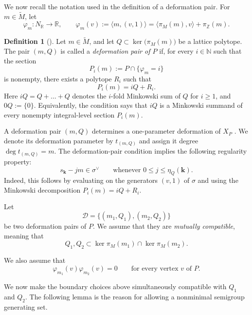 \documentclass[11pt]{amsart}
\numberwithin{equation}{section}
\theoremstyle{plain}
\theoremstyle{definition}
\newtheorem{definition}[theorem]{Definition}
\newcommand{\0}{$0$-mutable}
\newcommand{\NN}{\ensuremath{\mathbb{N}}}
\newcommand{\RR}{\ensuremath{\mathbb{R}}}
\newcommand{\ZZ}{\ensuremath{\mathbb{Z}}}
\renewcommand{\1}{$1$-rigid}
\renewcommand{\0}{$0$-mutable}
\begin{document}
{We now recall the notation used in the definition of a deformation
pair. For \(m\in\widetilde M\), let
\[
\varphi_m\colon N_{\RR}\longrightarrow\RR,
\qquad
\varphi_m(v)
:=
\langle m,(v,1)\rangle
=
\langle\pi_M(m),v\rangle+\pi_{\ZZ}(m).
\]}

{
\begin{definition}[\cite{Fil26}]
\label{def deformation pair}
Let \(m\in\widetilde M\), and let
\(Q\subset\ker\bigl(\pi_M(m)\bigr)\) be a lattice polytope. The pair
\((m,Q)\) is called a \emph{deformation pair of \(P\)} if, for every
\(i\in\NN\) such that the section
\[
P_i(m):=P\cap\{\varphi_m=i\}
\]
is nonempty, there exists a polytope \(R_i\) such that
\[
P_i(m)=iQ+R_i.
\]
Here \(iQ=Q+\ldots+Q\) denotes the \(i\)-fold Minkowski sum of \(Q\) for \(i\geq1\),
and \(0Q:=\{0\}\). Equivalently, the condition says that \(iQ\) is a
Minkowski summand of every nonempty integral-level section \(P_i(m)\).
\end{definition}
}

{A deformation pair \((m,Q)\) determines a one-parameter deformation of
\(X_P\) \cite[Corollary 3.9]{Fil26}.} We denote its deformation parameter
by \(t_{(m,Q)}\) and assign it degree
$
\deg t_{(m,Q)}=m.
$
{The deformation-pair condition implies the following regularity property:
\begin{equation}
\label{eq one parameter regularity}
s_{\mathbf k}-jm\in\sigma^\vee
\qquad
\text{whenever }0\le j\le\eta_Q(\mathbf k).
\end{equation}
Indeed, this follows by evaluating on the generators $(v,1)$ of
$\sigma$ and using the Minkowski decomposition
$P_i(m)=iQ+R_i$.}

Let
\[
\mathcal D
=
\bigl\{(m_1,Q_1),(m_2,Q_2)\bigr\}
\]
be two deformation pairs of \(P\). We assume that they are
\emph{mutually compatible}, meaning that
\begin{equation}
\label{eq mutually orthogonal summands}
Q_1,Q_2
\subset
\ker\pi_M(m_1)\cap\ker\pi_M(m_2).
\end{equation}

We also assume that
\begin{equation}
\label{eq disjoint positive loci}
\varphi_{m_1}(v)\varphi_{m_2}(v)=0
\qquad
\text{for every vertex }v\text{ of }P.
\end{equation}

We now make the boundary choices above simultaneously compatible with
\(Q_1\) and \(Q_2\). The following lemma is the reason for allowing a
nonminimal semigroup generating set.
\end{document}
